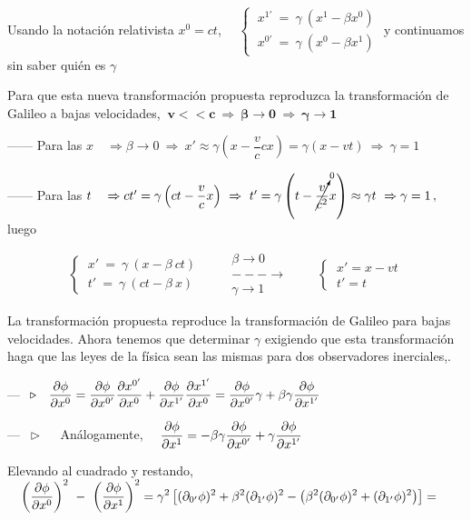 Usando la notación relativista $x^0=ct$, $\quad \begin{cases} \ x^{1'} \ = \ \gamma \ (x^1-\beta x^0) \\ \ x^{0'} \ = \ \gamma \ (x^0-\beta x^1) \end{cases}$ y continuamos sin saber quién es $\gamma$

Para que esta nueva transformación propuesta reproduzca la transformación de Galileo a bajas velocidades, $\ \boldsymbol{ v<< c \ \Rightarrow \ \beta \to 0 \ \Rightarrow \ \gamma \to 1 }$


------ Para las $x \quad \Rightarrow \beta \to 0 \ \Rightarrow \ x'\approx \gamma \left( x-\dfrac v c c x \right) = \gamma  (x-vt) \ \Rightarrow \ \gamma=1$

------ Para las $t \quad \Rightarrow ct'=\gamma \left( ct - \dfrac v c x \right) \ \Rightarrow \ t'=\gamma \left( t - \cancelto{0}{\dfrac v {c^2}} x \right) \approx \gamma t \ \Rightarrow \gamma = 1\, , \ $ luego

$$\begin{cases}
\ x' \ = \ \gamma \ (x-\beta \ c t )	 \\ \ t' \ = \ \gamma \ (ct - \beta \ x)	
\end{cases}
\qquad \begin{matrix} \beta \to 0 \\ ---\longrightarrow \\ \gamma \to 1 \end{matrix} \qquad
\begin{cases}
\ x'=x-vt \\ \ t'=t		
\end{cases}$$

La transformación propuesta reproduce la transformación de Galileo para bajas velocidades. Ahora tenemos que determinar $\gamma$ exigiendo que esta transformación haga que las leyes de la física sean las mismas para dos observadores inerciales,.

--- $\ \triangleright \quad \displaystyle \pdv{\phi}{x^0}=
\pdv{\phi}{x^{0'}}\pdv{x^{0'}}{x^0}+\pdv{\phi}{x^{1'}}\pdv{x^{1'}}{x^0}=
\pdv{\phi}{x^{0'}} \gamma + \beta \gamma \pdv{\phi}{x^{1'}}$

--- $\ \triangleright \quad $ Análogamente, $\quad \displaystyle \pdv{\phi}{x^1}=
-\beta \gamma \pdv{\phi}{x^{0'}} + \gamma \pdv{\phi}{x^{1'}}$

Elevando al cuadrado y restando, $\quad \displaystyle \left( \pdv{\phi}{x^0} \right)^2 \ - \ \left( \pdv{\phi}{x^1} \right)^2 =
\gamma ^2 \left[ (\partial_{0'} \phi)^2 + \beta^2 (\partial_{1'} \phi)^2 - \left( \beta^2 (\partial_{0'} \phi)^2+ (\partial_{1'} \phi)^2 \right) \right]=$

